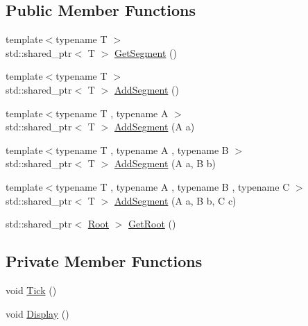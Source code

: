 \subsection*{Public Member Functions}
\begin{DoxyCompactItemize}
\item 
{\footnotesize template$<$typename T $>$ }\\std\+::shared\+\_\+ptr$<$ T $>$ \mbox{\hyperlink{classharu_1_1_object_a7e92cffe420755e9385ddf3471a5bded}{Get\+Segment}} ()
\item 
{\footnotesize template$<$typename T $>$ }\\std\+::shared\+\_\+ptr$<$ T $>$ \mbox{\hyperlink{classharu_1_1_object_ad285384303303dd6b281a570810f18ca}{Add\+Segment}} ()
\item 
{\footnotesize template$<$typename T , typename A $>$ }\\std\+::shared\+\_\+ptr$<$ T $>$ \mbox{\hyperlink{classharu_1_1_object_a267199c40485c94b3bdc180d397a05ec}{Add\+Segment}} (A a)
\item 
{\footnotesize template$<$typename T , typename A , typename B $>$ }\\std\+::shared\+\_\+ptr$<$ T $>$ \mbox{\hyperlink{classharu_1_1_object_a31a365466f2ea7b3a0b41d1942f29f59}{Add\+Segment}} (A a, B b)
\item 
{\footnotesize template$<$typename T , typename A , typename B , typename C $>$ }\\std\+::shared\+\_\+ptr$<$ T $>$ \mbox{\hyperlink{classharu_1_1_object_afa6249bdd2fe914f724289884ddd5a51}{Add\+Segment}} (A a, B b, C c)
\item 
std\+::shared\+\_\+ptr$<$ \mbox{\hyperlink{classharu_1_1_root}{Root}} $>$ \mbox{\hyperlink{classharu_1_1_object_a4c4a67d8ba840d295876f80a12163281}{Get\+Root}} ()
\end{DoxyCompactItemize}
\subsection*{Private Member Functions}
\begin{DoxyCompactItemize}
\item 
void \mbox{\hyperlink{classharu_1_1_object_a38daa375a6573f00fa150848fc3a6dde}{Tick}} ()
\item 
void \mbox{\hyperlink{classharu_1_1_object_a18e746943f998314aa27ffb96dac71cb}{Display}} ()
\end{DoxyCompactItemize}
